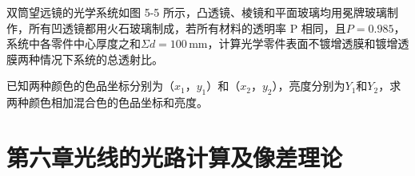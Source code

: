 \documentclass[standard, analysis, notocnum]{ExBook}
\newcommand{\answerarea}[1][8cm]{%
  \par\vspace{2mm}%
  \noindent{\color{themeColor!35}\rule{\linewidth}{0.4pt}}\par
  \noindent\begin{minipage}[t][#1][t]{\linewidth}\vspace{0pt}\end{minipage}\par
  \noindent{\color{themeColor!35}\rule{\linewidth}{0.4pt}}\par
}
\begin{document}
\begin{qitems}[startnum=4]
\qitem 双筒望远镜的光学系统如图 5-5 所示，凸透镜、棱镜和平面玻璃均用冕牌玻璃制作，所有凹透镜都用火石玻璃制成，若所有材料的透明率 P 相同，且$P=0.985$，系统中各零件中心厚度之和$\Sigma d=100\,\mathrm{mm}$，计算光学零件表面不镀增透膜和镀增透膜两种情况下系统的总透射比。
\label{q:98:start}
\answerarea[8cm]
\label{q:98:end}
\end{qitems}

\begin{qitems}[startnum=5]
\qitem 已知两种颜色的色品坐标分别为（$x_{1}$，$y_{1}$）和（$x_{2}$，$y_{2}$），亮度分别为$Y_{1}$和$Y_{2}$，求两种颜色相加混合色的色品坐标和亮度。
\label{q:99:start}
\answerarea[8cm]
\label{q:99:end}
\end{qitems}

\section{第六章\quad 光线的光路计算及像差理论}
\end{document}
